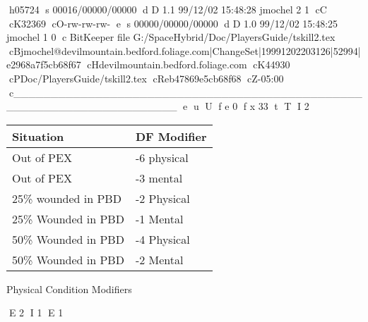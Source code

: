 h05724
s 00016/00000/00000
d D 1.1 99/12/02 15:48:28 jmochel 2 1
cC
cK32369
cO-rw-rw-rw-
e
s 00000/00000/00000
d D 1.0 99/12/02 15:48:25 jmochel 1 0
c BitKeeper file G:/SpaceHybrid/Doc/PlayersGuide/tskill2.tex
cBjmochel@devilmountain.bedford.foliage.com|ChangeSet|19991202203126|52994|e2968a7f5cb68f67
cHdevilmountain.bedford.foliage.com
cK44930
cPDoc/PlayersGuide/tskill2.tex
cReb47869e5cb68f68
cZ-05:00
c______________________________________________________________________
e
u
U
f e 0
f x 33
t
T
I 2
\begin{SHTable}[h]
	\begin{tabular}{ll}
	Situation			& DF Modifier	\\ 
	\hline
	Out of PEX			& -6 physical	\\
	Out of PEX			& -3 mental		\\
	25\% wounded in PBD & -2 Physical	\\
	25\% Wounded in PBD & -1 Mental		\\
	50\% Wounded in PBD & -4 Physical	\\
	50\% Wounded in PBD & -2 Mental		\\ 
    \end{tabular}
    \caption{Physical Condition Modifiers}
\end{SHTable}

E 2
I 1
E 1

